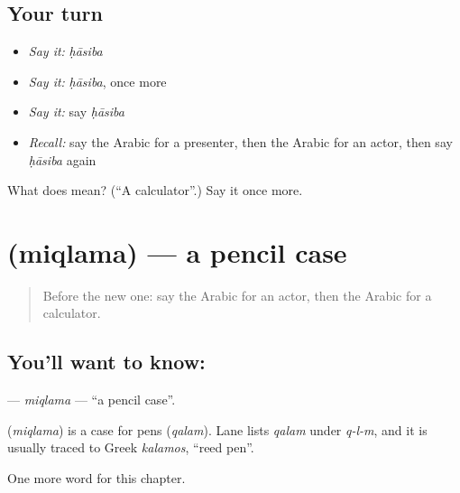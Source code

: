 \subsection*{Your turn}
\begin{itemize}
\raggedright
  \item \emph{Say it:} \emph{ḥāsiba}
  \item \emph{Say it:} \emph{ḥāsiba}, once more
  \item \emph{Say it:} say \emph{ḥāsiba}
  \item \emph{Recall:} say the Arabic for a presenter, then the Arabic for an actor, then say \emph{ḥāsiba} again
\end{itemize}

\begin{tcolorbox}[breakable,colback=teal!4,colframe=teal!35!black,title={Before you move on}]
What does  mean? (\textquotedblleft{}A calculator\textquotedblright{}.) Say it once more.
\end{tcolorbox}
\section[\texorpdfstring{\ar{مقلمة} (miqlama)}{مقلمة (miqlama)}]{ (miqlama) — a pencil case}

\label{lesson:AR-C282-miqlama}



\begin{quote}
Before the new one: say the Arabic for an actor, then the Arabic for a calculator.
\end{quote}

\subsection*{You'll want to know: }
\textbf{} — \emph{miqlama} — \textquotedblleft{}a pencil case\textquotedblright{}.

\begin{cousinweb}
\textbf{} (\emph{miqlama}) is a case for pens (\emph{qalam}). Lane lists \emph{qalam} under \emph{q-l-m}, and it is usually traced to Greek \emph{kalamos}, \textquotedblleft{}reed pen\textquotedblright{}.
\end{cousinweb}

\begin{grammarlens}[title={What you've built}]
One more word for this chapter.
\end{grammarlens}

